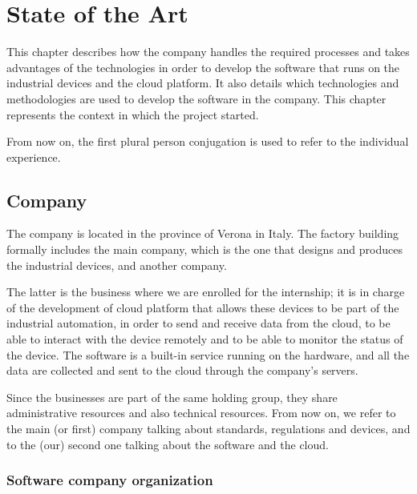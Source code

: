 \chapter{State of the Art}

This chapter describes how the company handles the required processes and takes advantages of the technologies in order to develop the software that runs on the industrial devices and the cloud platform. It also details which technologies and methodologies are used to develop the software in the company. This chapter represents the context in which the project started.

From now on, the first plural person conjugation is used to refer to the individual experience.

\section{Company}

The company is located in the province of Verona in Italy. The factory building formally includes the main company, which is the one that designs and produces the industrial devices, and another company.

The latter is the business where we are enrolled for the internship; it is in charge of the development of cloud platform that allows these devices to be part of the industrial automation, in order to send and receive data from the cloud, to be able to interact with the device remotely and to be able to monitor the status of the device. The software is a built-in service running on the hardware, and all the data are collected and sent to the cloud through the company's servers.

Since the businesses are part of the same holding group, they share administrative resources and also technical resources. From now on, we refer to the main (or first) company talking about standards, regulations and devices, and to the (our) second one talking about the software and the cloud.

\subsection{Software company organization}

